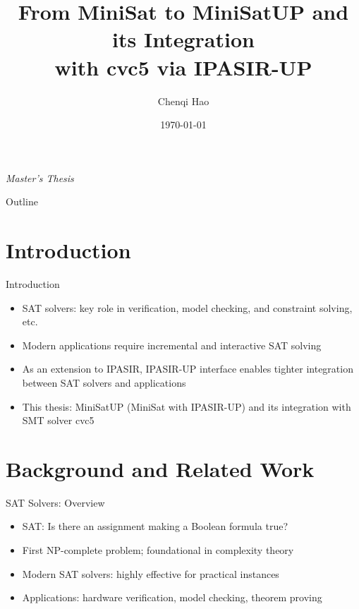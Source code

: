 \documentclass{beamer}
\title[MiniSatUP and its Integration with cvc5]{From MiniSat to MiniSatUP and its Integration \\ with cvc5 via IPASIR-UP}
\author{Chenqi Hao}
\institute{University of Freiburg}
\date{\today}
\begin{document}
\begin{frame}
  \centering \textit{Master's Thesis}
  \titlepage
\end{frame}

\begin{frame}{Outline}
  \tableofcontents
\end{frame}

\section{Introduction}

\begin{frame}{Introduction}
  \begin{itemize}
    \item SAT solvers: key role in verification, model checking, and constraint solving, etc.
    \item Modern applications require incremental and interactive SAT solving
    \item As an extension to IPASIR, IPASIR-UP interface enables tighter integration between SAT solvers and applications
    \item This thesis: MiniSatUP (MiniSat with IPASIR-UP) and its integration with SMT solver cvc5
  \end{itemize}
\end{frame}

\section{Background and Related Work}

\begin{frame}{SAT Solvers: Overview}
  \begin{itemize}
    \item SAT: Is there an assignment making a Boolean formula true?
    \item First NP-complete problem; foundational in complexity theory
    \item Modern SAT solvers: highly effective for practical instances
    \item Applications: hardware verification, model checking, theorem proving
  \end{itemize}
\end{frame}
\end{document}
